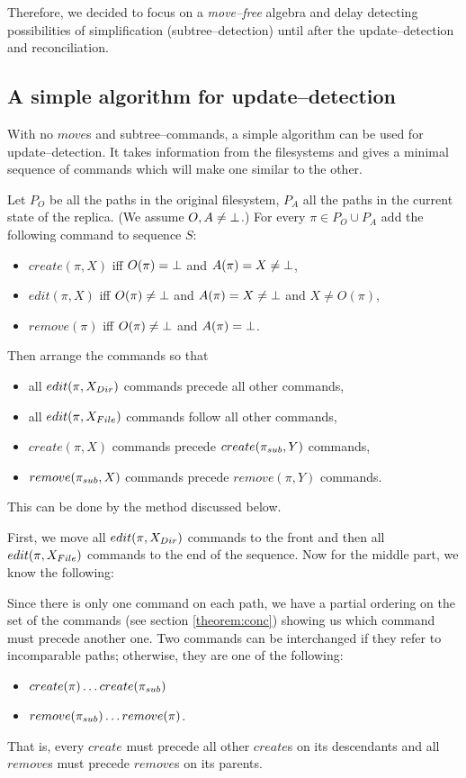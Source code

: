 
Therefore, we decided to focus on a \emph{move--free} algebra and delay
detecting possibilities of simplification (subtree--detection) until
after the update--detection and reconciliation.

\subsection{A simple algorithm for update--detection}
\label{app:upd}

With no \(move\)s and subtree--commands, a simple algorithm can be
used for update--detection. It takes information from the filesystems
and gives a minimal sequence of commands which will make one similar to
the other. 

Let \(P_O\) be all the paths in the original
filesystem, \(P_A\) all the paths in the current state of the replica. 
(We assume \(O,A\ne\bot\).)
For
every \(\pi\in P_O\cup P_A\) add the following command to sequence \(S\):
\begin{itemize}
\item \(create(\pi,X)\) iff \(O(\pi)=\bot\) and \(A(\pi)=X\ne\bot\),
\item \(edit(\pi,X)\) iff \(O(\pi)\ne\bot\) and \(A(\pi)=X\ne\bot\) and
\(X\ne O(\pi)\),
\item \(remove(\pi)\) iff \(O(\pi)\ne\bot\) and \(A(\pi)=\bot\).
\end{itemize}
Then arrange the commands so that
\begin{itemize}
\item all \(edit(\pi,X_{Dir})\) commands precede all other commands, 
\item all \(edit(\pi,X_{File})\) commands follow all other commands,
\item \(create(\pi,X)\) commands precede \(create(\pi_{sub},Y)\) commands,
\item \(remove(\pi_{sub},X)\) commands precede \(remove(\pi,Y)\) commands.
\end{itemize}
This can be done by the method discussed below.

First, we move all \(edit(\pi,X_{Dir})\) commands to the front and then
all \(edit(\pi,X_{File})\) commands to the end of the sequence. Now for
the middle part, we know the following:

Since there is only one command on each path, we have a partial
ordering on the set of the commands (see section
\ref{theorem:conc}) showing us which command must precede another one.
Two commands can be interchanged if they refer to incomparable
paths; otherwise, they are one of the following:
\begin{itemize}
\item \(create(\pi) \ldots create(\pi_{sub})\)
\item \(remove(\pi_{sub}) \ldots remove(\pi)\).
\end{itemize}
That is, every \(create\) must precede all other \(create\)s on its
descendants and all \(remove\)s must precede \(remove\)s on its parents.

